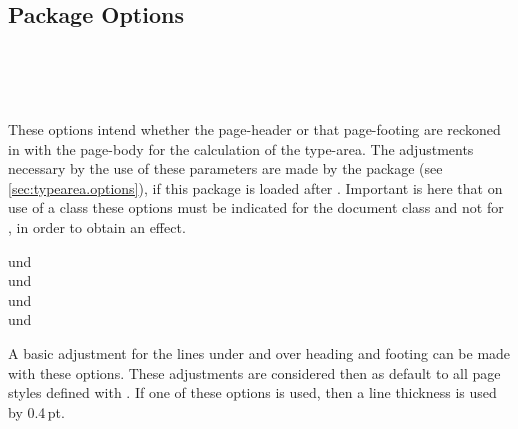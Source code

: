 \subsection{Package Options}\label{sec:scrpage.basics.options}

\begin{Declaration}
\\
\\
\\
\end{Declaration}%
These options intend whether the page-header or that page-footing
are reckoned in with the page-body for the calculation of the type-area.
The adjustments necessary by the use of these parameters
are made by the package
 (see \autoref{sec:typearea.options}), if this
package is loaded after .
Important is here that on use of a \KOMAScript{} class
these options must be indicated for the document class and not
for , in order to obtain an effect.
%

\begin{Declaration}
 und \\
 und \\
 und \\
 und 
\end{Declaration}%
A basic adjustment for the lines under and over heading and footing
can be made with these options.
These adjustments are considered then as default to all
page styles defined with .
If one of these options is used, then a line thickness
is used by 0.4\,pt.

